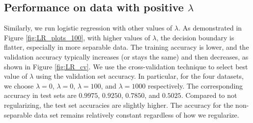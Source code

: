 \subsection{Performance on data with positive $\lambda$}
Similarly, we run logistic regression with other values of $\lambda$. As demonstrated in Figure \ref{fig:LR_plots_100}, with higher values of $\lambda$, the decision boundary is flatter, especially in more separable data. The training accuracy is lower, and the validation accuracy typically increases (or stays the same) and then decreases, as shown in Figure \ref{fig:LR_cv}. We use the cross-validation technique to select best value of $\lambda$ using the validation set accuracy. In particular, for the four datasets, we choose $\lambda = 0$, $\lambda = 0$, $\lambda = 100$, and $\lambda = 1000$ respectively. The corresponding accuracy in test sets are $0.9975$, $0.9250$, $0.7850$, and $0.5025$. Compared to not regularizing, the test set accuracies are slightly higher. The accuracy for the non-separable data set remains relatively constant regardless of how we regularize. 


